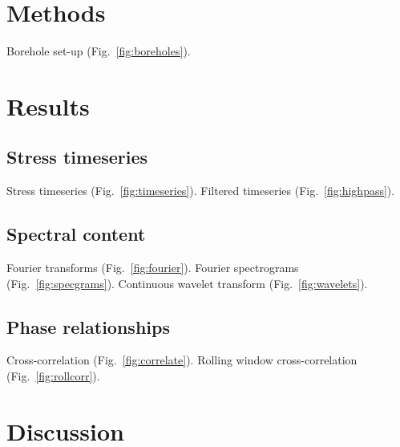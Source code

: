 \documentclass[utf8]{article}
\begin{document}
\section{Methods}

    Borehole set-up (Fig.~\ref{fig:boreholes}).

\section{Results}

\subsection{Stress timeseries}

    Stress timeseries (Fig.~\ref{fig:timeseries}).
    Filtered timeseries (Fig.~\ref{fig:highpass}).

\subsection{Spectral content}

    Fourier transforms (Fig.~\ref{fig:fourier}).
    Fourier spectrograms (Fig.~\ref{fig:specgrams}).
    Continuous wavelet transform (Fig.~\ref{fig:wavelets}).

\subsection{Phase relationships}

    Cross-correlation (Fig.~\ref{fig:correlate}).
    Rolling window cross-correlation (Fig.~\ref{fig:rollcorr}).

\section{Discussion}
\end{document}
